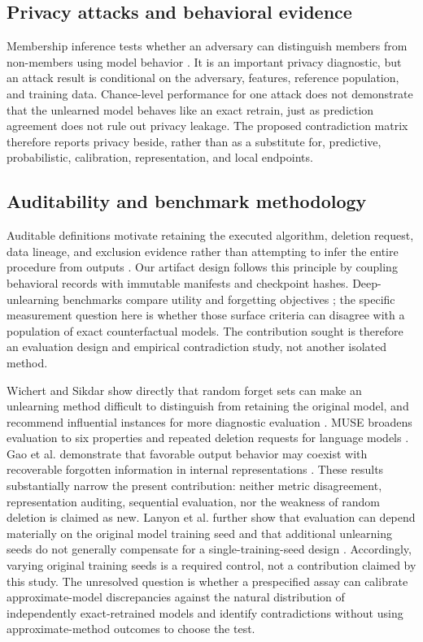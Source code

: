 \subsection{Privacy attacks and behavioral evidence}
Membership inference tests whether an adversary can distinguish members from non-members
using model behavior \cite{shokri2017membership}.  It is an important privacy diagnostic,
but an attack result is conditional on the adversary, features, reference population, and
training data.  Chance-level performance for one attack does not demonstrate that the
unlearned model behaves like an exact retrain, just as prediction agreement does not rule
out privacy leakage.  The proposed contradiction matrix therefore reports privacy beside,
rather than as a substitute for, predictive, probabilistic, calibration, representation,
and local endpoints.

\subsection{Auditability and benchmark methodology}
Auditable definitions motivate retaining the executed algorithm, deletion request, data
lineage, and exclusion evidence rather than attempting to infer the entire procedure from
outputs \cite{thudi2022auditable}.  Our artifact design follows this principle by coupling
behavioral records with immutable manifests and checkpoint hashes.  Deep-unlearning
benchmarks compare utility and forgetting objectives \cite{kurmanji2023unbounded}; the
specific measurement question here is whether those surface criteria can disagree with a
population of exact counterfactual models.  The contribution sought is therefore an
evaluation design and empirical contradiction study, not another isolated method.

Wichert and Sikdar show directly that random forget sets can make an unlearning method
difficult to distinguish from retaining the original model, and recommend influential
instances for more diagnostic evaluation \cite{wichert2024rethinking}.  MUSE broadens
evaluation to six properties and repeated deletion requests for language models
\cite{shi2025muse}.  Gao et al. demonstrate that favorable output behavior may coexist
with recoverable forgotten information in internal representations
\cite{gao2026illusion}.  These results substantially narrow the present contribution:
neither metric disagreement, representation auditing, sequential evaluation, nor the
weakness of random deletion is claimed as new.  Lanyon et al. further show that evaluation
can depend materially on the original model training seed and that additional unlearning
seeds do not generally compensate for a single-training-seed design
\cite{lanyon2026seeds}.  Accordingly, varying original training seeds is a required control,
not a contribution claimed by this study.  The unresolved question is whether a
prespecified assay can calibrate approximate-model discrepancies against the natural
distribution of independently exact-retrained models and identify contradictions without
using approximate-method outcomes to choose the test.

